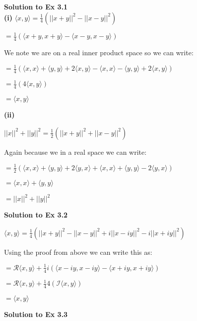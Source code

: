 \documentclass[letterpaper,12pt]{article}
\theoremstyle{definition}
\begin{document}
	\begin{spacing}{1.3}{}
		\vspace{1 mm}
	
	\textbf{Solution to Ex 3.1}
	\setlength{\leftskip}{10pt}\\
	\textbf{(i)}
	\setlength{\leftskip}{20pt}
	$\langle x, y \rangle = \frac{1}{4}(||x + y||^2 - ||x - y||^2)$
	
	$= \frac{1}{4}(\langle x + y, x + y \rangle - \langle x - y, x - y \rangle)$
	
	We note we are on a real inner product space so we can write:
	
	$= \frac{1}{4}(\langle x, x \rangle + \langle y, y \rangle + 2\langle x, y \rangle - \langle x, x \rangle - \langle y, y \rangle + 2\langle x, y \rangle)$
	
	$= \frac{1}{4}(4\langle x, y \rangle)$
	
	$= \langle x, y \rangle$
	
	\setlength{\leftskip}{10pt}
	
	\textbf{(ii)}
	
	\setlength{\leftskip}{20pt}
	
	$||x||^2 + ||y||^2 = \frac{1}{2}(||x + y||^2 + ||x - y||^2)$
	
	Again because we in a real space we can write:
	
	$= \frac{1}{2}(\langle x, x \rangle + \langle y, y \rangle + 2\langle y, x \rangle + \langle x, x \rangle + \langle y, y \rangle - 2\langle y, x \rangle)$
	
	$= \langle x, x \rangle + \langle y, y \rangle$
	
	$= ||x||^2 + ||y||^2$
	
	\setlength{\leftskip}{0pt}
	
	\textbf{Solution to Ex 3.2}
	
	\setlength{\leftskip}{20pt}
	
	$\langle x, y \rangle = \frac{1}{4}(||x + y||^2 - ||x - y||^2 + i||x - iy||^2 - i||x + iy||^2)$
	
	Using the proof from above we can write this as:
	
	$= \mathcal{R} \langle x, y \rangle +\frac{1}{4}i(\langle x-iy, x-iy \rangle - \langle x+iy, x+iy \rangle)$
	
	$= \mathcal{R} \langle x, y \rangle +\frac{1}{4}4( \mathcal{I} \langle x, y \rangle)$
	
	$= \langle x, y \rangle$
	
	\setlength{\leftskip}{0pt}
	
	\textbf{Solution to Ex 3.3}
	

\end{spacing}
\end{document}
